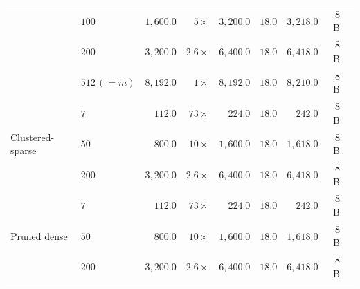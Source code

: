 \documentclass{article}
\theoremstyle{plain}
\theoremstyle{definition}
\theoremstyle{remark}
\begin{document}
\begin{table}[h]
\begin{tabular}{llrrrrrrr}
                                 & $100$       & $1{,}600.0$ & $5\times$   & $3{,}200.0$ & $18.0$ & $3{,}218.0$ & $8$ B \\
                                 & $200$       & $3{,}200.0$ & $2.6\times$ & $6{,}400.0$ & $18.0$ & $6{,}418.0$ & $8$ B \\
                                 & $512\,(=m)$ & $8{,}192.0$ & $1\times$   & $8{,}192.0$ & $18.0$ & $8{,}210.0$ & $8$ B \\
        \midrule
        \multirow{3}{*}{Clustered-sparse}
                                 & $7$            & $112.0$    & $73\times$  & $224.0$    & $18.0$ & $242.0$    & $8$ B \\
                                 & $50$           & $800.0$    & $10\times$  & $1{,}600.0$ & $18.0$ & $1{,}618.0$ & $8$ B \\
                                 & $200$          & $3{,}200.0$ & $2.6\times$ & $6{,}400.0$ & $18.0$ & $6{,}418.0$ & $8$ B \\
        \midrule
        \multirow{3}{*}{Pruned dense}
                                 & $7$         & $112.0$    & $73\times$  & $224.0$    & $18.0$ & $242.0$    & $8$ B \\
                                 & $50$        & $800.0$    & $10\times$  & $1{,}600.0$ & $18.0$ & $1{,}618.0$ & $8$ B \\
                                 & $200$       & $3{,}200.0$ & $2.6\times$ & $6{,}400.0$ & $18.0$ & $6{,}418.0$ & $8$ B \\
        \bottomrule
    \end{tabular}
\end{table}
\end{document}
